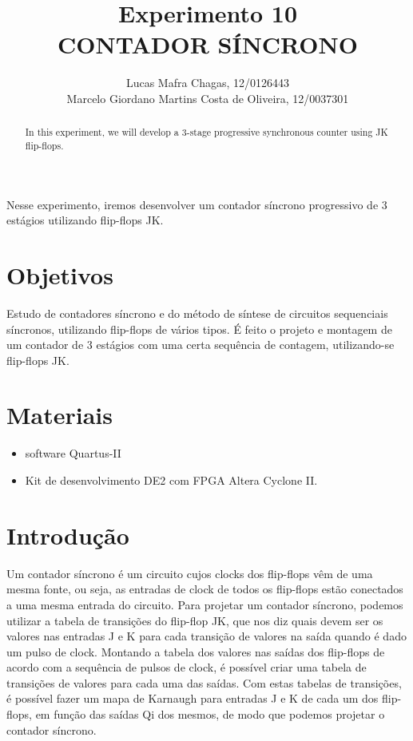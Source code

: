\documentclass[12pt]{article}
\title{Experimento 10\\ 
	CONTADOR SÍNCRONO}
\author{
	Lucas Mafra Chagas, 12/0126443 \\
	Marcelo Giordano Martins Costa de Oliveira,  12/0037301
}
\begin{document}
	
	\maketitle
	
	\begin{abstract}
		In this experiment, we will develop a 3-stage progressive synchronous counter using JK flip-flops.
	\end{abstract}
	
	\begin{resumo} 
		Nesse experimento, iremos desenvolver um contador síncrono progressivo de 3 estágios utilizando flip-flops JK.
	
	\end{resumo}
	
	\section{Objetivos}
	\label{sec:Objetivos}
		Estudo de contadores síncrono e do método de síntese de circuitos sequenciais síncronos, utilizando flip-flops de vários tipos. É feito o projeto e montagem de um contador de 3 estágios com uma certa sequência de contagem, utilizando-se flip-flops JK.
	
	
	\section{Materiais} 
	\label{sec:Materiais}
	
	\begin{itemize}
		\item software Quartus-II
		\item Kit de desenvolvimento DE2 com FPGA Altera Cyclone II.
	\end{itemize}
	
	\section{Introdução}
	\label{sec:Introducao}
	
	Um contador síncrono é um circuito cujos clocks dos flip-flops vêm de uma mesma fonte, ou seja, as entradas de clock de todos os flip-flops estão conectados a uma mesma entrada do circuito.
	Para projetar um contador síncrono, podemos utilizar a tabela de transições do flip-flop JK, que nos diz quais devem ser os valores nas entradas J e K para cada transição de valores na saída quando é dado um pulso de clock.
	Montando a tabela dos valores nas saídas dos flip-flops de acordo com a sequência de pulsos de clock, é possível criar uma tabela de transições de valores para cada uma das saídas. Com estas tabelas de transições, é possível fazer um mapa de Karnaugh para entradas J e K de cada um dos flip-flops, em função das saídas Qi dos mesmos, de modo que podemos projetar o contador síncrono.
	
\end{document}
